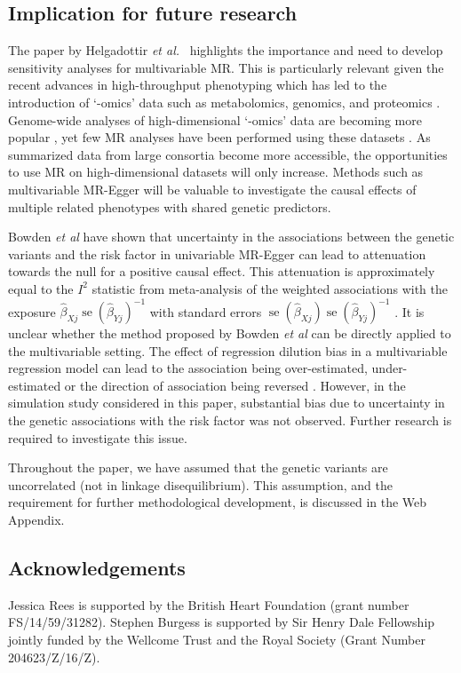 \documentclass[a4paper,12pt]{article}
\DeclareMathOperator{\se}{se} %
\begin{document}
\begin{bibunit}[wileyj]
\subsection{Implication for future research}
The paper by Helgadottir \textit{et al.}\ \cite{helgadottir2016} highlights the importance and need to develop sensitivity analyses for multivariable MR. This is particularly relevant given the recent advances in high-throughput phenotyping which has led to the introduction of `-omics' data such as metabolomics, genomics, and proteomics \cite{relton2012epigenetics}. Genome-wide analyses of high-dimensional `-omics' data are becoming more popular \cite{suhre2016,kastenmuller2015}, yet few MR analyses have been performed using these datasets \cite{burgess2016lipids}. As summarized data from large consortia become more accessible, the opportunities to use MR on high-dimensional datasets will only increase.  Methods such as multivariable MR-Egger will be valuable to investigate the causal effects of multiple related phenotypes with shared genetic predictors.  

Bowden \textit{et al} \cite{bowden2016I_2} have shown that uncertainty in the associations between the genetic variants and the risk factor in univariable MR-Egger can lead to attenuation towards the null for a positive causal effect.  This attenuation is approximately equal to the $I^2$ statistic from meta-analysis of the weighted associations with the exposure $\hat{\beta}_{Xj} \se(\hat{\beta}_{Yj})^{-1}$ with standard errors $\se(\hat{\beta}_{Xj}) \se(\hat{\beta}_{Yj})^{-1}$ \cite{bowden2016I_2}. It is unclear whether the method proposed by Bowden \textit{et al} \cite{bowden2016I_2} can be directly applied to the multivariable setting. The effect of regression dilution bias in a multivariable regression model can lead to the association being over-estimated, under-estimated or the direction of association being reversed \cite{Frost2005}. However, in the simulation study considered in this paper,
substantial bias due to uncertainty in the genetic associations with the
risk factor was not observed. Further research is required to investigate this issue. 

Throughout the paper, we have assumed that the genetic variants are uncorrelated (not in linkage disequilibrium). This assumption, and the requirement for further methodological development, is discussed in the Web Appendix. 

\subsection*{Acknowledgements}
Jessica Rees is supported by the British Heart Foundation (grant number FS/14/59/31282). Stephen Burgess is supported by Sir Henry Dale Fellowship jointly funded by the Wellcome Trust and the Royal Society (Grant Number 204623/Z/16/Z). 

\clearpage
{}
\end{bibunit}
\end{document}
